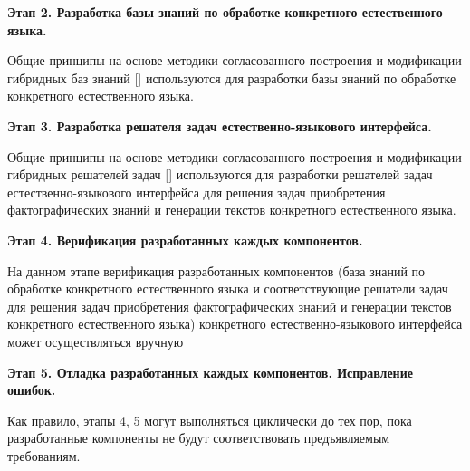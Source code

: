 \textbf{Этап 2. Разработка базы знаний по обработке конкретного естественного языка.}

Общие принципы на основе методики согласованного построения и модификации гибридных баз знаний [] используются для разработки базы знаний по обработке конкретного естественного языка.

\textbf{Этап 3. Разработка решателя задач естественно-языкового интерфейса.}

Общие принципы на основе методики согласованного построения и модификации гибридных решателей задач [] используются для разработки решателей задач естественно-языкового интерфейса для решения задач приобретения фактографических знаний и генерации текстов конкретного естественного языка.

\textbf{Этап 4. Верификация разработанных каждых компонентов.}

На данном этапе верификация разработанных компонентов (база знаний по обработке конкретного естественного языка и соответствующие решатели задач для решения задач приобретения фактографических знаний и генерации текстов конкретного естественного языка) конкретного естественно-языкового интерфейса может осуществляться вручную

\textbf{Этап 5. Отладка разработанных каждых компонентов. Исправление ошибок.}

Как правило, этапы 4, 5 могут выполняться циклически до тех пор, пока разработанные компоненты не будут соответствовать предъявляемым требованиям.

